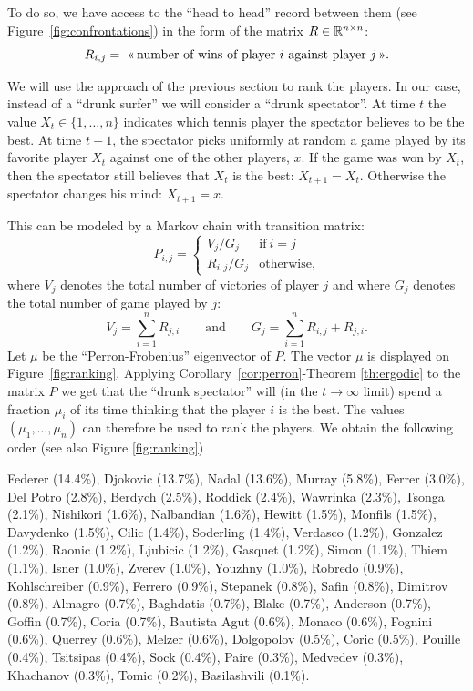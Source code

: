\documentclass[11pt,nocut]{article}
\begin{document}
To do so, we have access to the ``head to head'' record between them (see Figure~\ref{fig:confrontations}) in the form of the matrix $R \in \mathbb{R}^{n \times n}$:
\begin{equation}\label{eq:def_R}
R_{i,j} = \ \text{<<\,number of wins of player $i$ against player $j$\,>>}.
\end{equation}


We will use the approach of the previous section to rank the players. In our case, instead of a ``drunk surfer'' we will consider a ``drunk spectator''.
At time $t$ the value $X_t \in \{1, \dots, n\}$ indicates which tennis player the spectator believes to be the best. At time $t+1$, the spectator picks uniformly at random a game played by its favorite player $X_t$ against one of the other players, $x$.
If the game was won by $X_t$, then the spectator still believes that $X_t$ is the best: $X_{t+1} = X_t$. Otherwise the spectator changes his mind: $X_{t+1} = x$.

This can be modeled by a Markov chain with transition matrix:
$$
P_{i,j} = 
\begin{cases}
	V_j/G_j & \text{if} \ i = j \\
	R_{i,j}/G_j & \text{otherwise,}
\end{cases}
$$
where $V_j$ denotes the total number of victories of player $j$ and where $G_j$ denotes the total number of game played by $j$:
$$
V_{j} = \sum_{i=1}^n R_{j,i} \qquad \text{and} \qquad G_j = \sum_{i=1}^n R_{i,j} + R_{j,i}.
$$
Let $\mu$ be the ``Perron-Frobenius'' eigenvector of $P$. The vector $\mu$ is displayed on Figure~\ref{fig:ranking}.
Applying Corollary~\ref{cor:perron}-Theorem \ref{th:ergodic} to the matrix $P$ we get that the ``drunk spectator'' will (in the $t \to \infty$ limit) spend a fraction $\mu_i$ of its time thinking that the player $i$ is the best. The values $(\mu_1, \dots, \mu_n)$ can therefore be used to rank the players. We obtain the following order (see also Figure \ref{fig:ranking})
\begin{center}
Federer (14.4\%),
Djokovic (13.7\%),
Nadal (13.6\%),
Murray (5.8\%),
Ferrer (3.0\%),
Del Potro (2.8\%),
Berdych (2.5\%),
Roddick (2.4\%),
Wawrinka (2.3\%),
Tsonga (2.1\%),
Nishikori (1.6\%),
Nalbandian (1.6\%),
Hewitt (1.5\%),
Monfils (1.5\%),
Davydenko (1.5\%),
Cilic (1.4\%),
Soderling (1.4\%),
Verdasco (1.2\%),
Gonzalez (1.2\%),
Raonic (1.2\%),
Ljubicic (1.2\%),
Gasquet (1.2\%),
Simon (1.1\%),
Thiem (1.1\%),
Isner (1.0\%),
Zverev (1.0\%),
Youzhny (1.0\%),
Robredo (0.9\%),
Kohlschreiber (0.9\%),
Ferrero (0.9\%),
Stepanek (0.8\%),
Safin (0.8\%),
Dimitrov (0.8\%),
Almagro (0.7\%),
Baghdatis (0.7\%),
Blake (0.7\%),
Anderson (0.7\%),
Goffin (0.7\%),
Coria (0.7\%),
Bautista Agut (0.6\%),
Monaco (0.6\%),
Fognini (0.6\%),
Querrey (0.6\%),
Melzer (0.6\%),
Dolgopolov (0.5\%),
Coric (0.5\%),
Pouille (0.4\%),
Tsitsipas (0.4\%),
Sock (0.4\%),
Paire (0.3\%),
Medvedev (0.3\%),
Khachanov (0.3\%),
Tomic (0.2\%),
Basilashvili (0.1\%).
\end{center}
\end{document}
